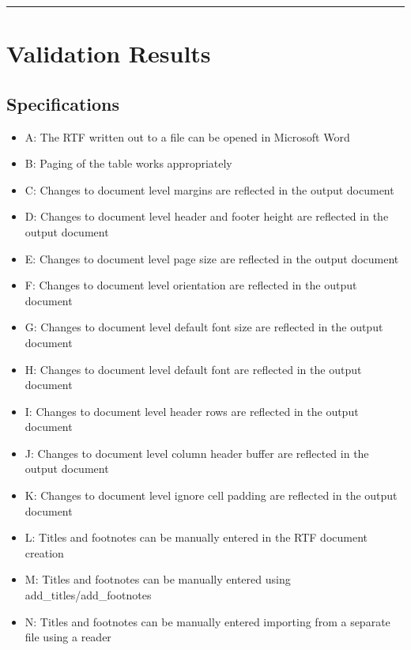 \documentclass[]{article}
\providecommand{\tightlist}{%
  \setlength{\itemsep}{0pt}\setlength{\parskip}{0pt}}
\begin{document}
\begin{center}\rule{0.5\linewidth}{0.5pt}\end{center}

\hypertarget{validation-results}{%
\section{Validation Results}\label{validation-results}}

\hypertarget{specifications-1}{%
\subsection{Specifications}\label{specifications-1}}

\begin{itemize}
\tightlist
\item
  A: The RTF written out to a file can be opened in Microsoft Word
\item
  B: Paging of the table works appropriately
\item
  C: Changes to document level margins are reflected in the output
  document
\item
  D: Changes to document level header and footer height are reflected in
  the output document
\item
  E: Changes to document level page size are reflected in the output
  document
\item
  F: Changes to document level orientation are reflected in the output
  document
\item
  G: Changes to document level default font size are reflected in the
  output document
\item
  H: Changes to document level default font are reflected in the output
  document
\item
  I: Changes to document level header rows are reflected in the output
  document
\item
  J: Changes to document level column header buffer are reflected in the
  output document
\item
  K: Changes to document level ignore cell padding are reflected in the
  output document
\item
  L: Titles and footnotes can be manually entered in the RTF document
  creation
\item
  M: Titles and footnotes can be manually entered using
  add\_titles/add\_footnotes
\item
  N: Titles and footnotes can be manually entered importing from a
  separate file using a reader

\end{itemize}
\end{document}
